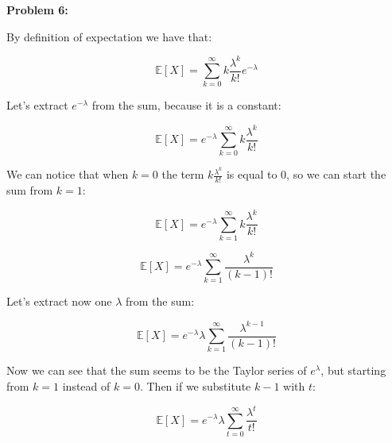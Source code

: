 \textbf{Problem 6:}

\singlespacing

By definition of expectation we have that:

\singlespacing

\begin{equation}
    \mathbb{E}[X] = \sum_{k=0}^{\infty} k \frac{\lambda^k}{k!}e^{-\lambda}
\end{equation}

\singlespacing

Let's extract $e^{-\lambda}$ from the sum, because it is a constant:

\singlespacing

\begin{equation}
    \mathbb{E}[X] = e^{-\lambda} \sum_{k=0}^{\infty} k \frac{\lambda^k}{k!}
\end{equation}

\singlespacing

We can notice that when $k = 0$ the term $k \frac{\lambda^k}{k!}$ is equal to $0$,
so we can start the sum from $k = 1$:

\singlespacing

\begin{equation}
    \mathbb{E}[X] = e^{-\lambda} \sum_{k=1}^{\infty} k \frac{\lambda^k}{k!}
\end{equation}

\singlespacing

\begin{equation}
    \mathbb{E}[X] = e^{-\lambda} \sum_{k=1}^{\infty} \frac{\lambda^k}{(k-1)!}
\end{equation}

\singlespacing

Let's extract now one $\lambda$ from the sum:

\singlespacing

\begin{equation}
    \mathbb{E}[X] = e^{-\lambda} \lambda \sum_{k=1}^{\infty} \frac{\lambda^{k-1}}{(k-1)!}
\end{equation}

\singlespacing

Now we can see that the sum seems to be the Taylor series of $e^{\lambda}$, but
starting from $k = 1$ instead of $k = 0$. Then if we substitute $k - 1$ with $t$:

\singlespacing

\begin{equation}
    \mathbb{E}[X] = e^{-\lambda} \lambda \sum_{t=0}^{\infty} \frac{\lambda^{t}}{t!}
\end{equation}

